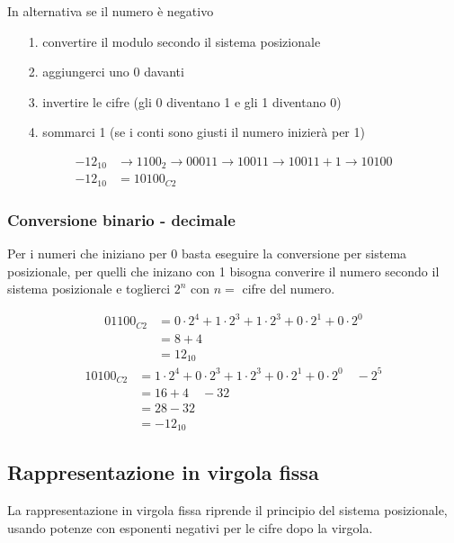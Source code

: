 \documentclass[a4paper]{article}
\begin{document}
In alternativa se il numero è negativo
\begin{itemize}[topsep=3pt, itemsep=0pt]
	\item[1.] convertire il modulo secondo il sistema posizionale
	\item[2.] aggiungerci uno 0 davanti
	\item[3.] invertire le cifre (gli 0 diventano 1 e gli 1 diventano 0)
	\item[4.] sommarci 1 (se i conti sono giusti il numero inizierà per 1)
\end{itemize}
\begin{align*}
	-12_{10} &\rightarrow 1100_{2} \rightarrow 00011 \rightarrow 10011 \rightarrow 10011 + 1 \rightarrow 10100 \\
	-12_{10} &= 10100_{C2}
\end{align*}

\subsubsection*{Conversione binario - decimale}
Per i numeri che iniziano per 0 basta eseguire la conversione per sistema posizionale, per quelli che inizano con
1 bisogna converire il numero secondo il sistema posizionale e toglierci \(2^n\) con \(n =\) cifre del numero.

\begin{align*}
	01100_{C2} &= 0 \cdot 2 ^ 4 + 1 \cdot 2 ^ 3 + 1 \cdot 2 ^ 3 + 0 \cdot 2 ^ 1 + 0 \cdot 2 ^ 0 \\
	&= 8 + 4 \\
	&= 12_{10}
\end{align*}
\begin{align*}
	10100_{C2} &= 1 \cdot 2 ^ 4 +  0 \cdot 2 ^ 3 + 1 \cdot 2 ^ 3 + 0 \cdot 2 ^ 1 + 0 \cdot 2 ^ 0 \quad - 2 ^ 5\\
	&= 16 + 4 \quad - 32 \\
	&= 28 - 32 \\
	&= -12_{10}
\end{align*}

\newpage

\subsection{Rappresentazione in virgola fissa}
La rappresentazione in virgola fissa riprende il principio del sistema posizionale, usando potenze con esponenti negativi
per le cifre dopo la virgola.
\end{document}

